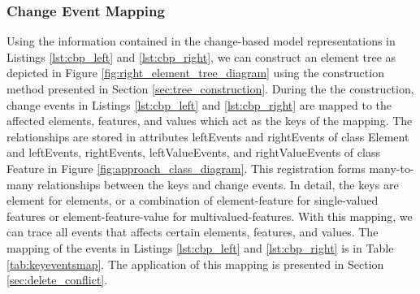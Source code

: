 \subsubsection{Change Event Mapping}
\label{sec:change_event_mapping}
Using the information contained in the change-based model representations in Listings \ref{lst:cbp_left} and \ref{lst:cbp_right}, we can construct an element tree as depicted in Figure \ref{fig:right_element_tree_diagram} using the construction method presented in Section \ref{sec:tree_construction}. During the the construction, change events in Listings \ref{lst:cbp_left} and \ref{lst:cbp_right} are mapped to the affected elements, features, and values which act as the keys of the mapping. The relationships are stored in attributes \textsf{leftEvents} and \textsf{rightEvents} of class \textsf{Element} and \textsf{leftEvents}, \textsf{rightEvents}, \textsf{leftValueEvents}, and \textsf{rightValueEvents} of class \textsf{Feature} in Figure \ref{fig:approach_class_diagram}. This registration forms many-to-many relationships between the keys and change events. In detail, the keys are \textsf{element} for elements, or a combination of \textsf{element-feature} for single-valued features or \textsf{element-feature-value} for multivalued-features. With this mapping, we can trace all events that affects certain elements, features, and values. The mapping of the events in Listings \ref{lst:cbp_left} and \ref{lst:cbp_right} is in Table \ref{tab:keyeventsmap}. The application of this mapping is presented in Section \ref{sec:delete_conflict}.

